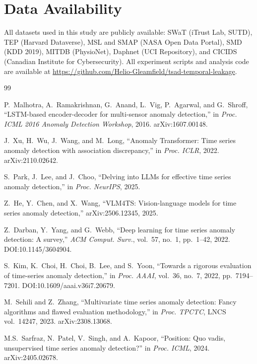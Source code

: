 \documentclass[preprint,12pt]{elsarticle}
\begin{document}
\section*{Data Availability}
All datasets used in this study are publicly available: SWaT (iTrust Lab, SUTD), TEP (Harvard Dataverse), MSL and SMAP (NASA Open Data Portal), SMD (KDD 2019), MITDB (PhysioNet), Daphnet (UCI Repository), and CICIDS (Canadian Institute for Cybersecurity). All experiment scripts and analysis code are available at \url{https://github.com/Helio-Gleamfield/tsad-temporal-leakage}.


\begin{thebibliography}{99}

P.~Malhotra, A.~Ramakrishnan, G.~Anand, L.~Vig, P.~Agarwal, and G.~Shroff, ``LSTM-based encoder-decoder for multi-sensor anomaly detection,'' in \emph{Proc. ICML 2016 Anomaly Detection Workshop}, 2016. arXiv:1607.00148.

J.~Xu, H.~Wu, J.~Wang, and M.~Long, ``Anomaly Transformer: Time series anomaly detection with association discrepancy,'' in \emph{Proc. ICLR}, 2022. arXiv:2110.02642.

S.~Park, J.~Lee, and J.~Choo, ``Delving into LLMs for effective time series anomaly detection,'' in \emph{Proc. NeurIPS}, 2025.

Z.~He, Y.~Chen, and X.~Wang, ``VLM4TS: Vision-language models for time series anomaly detection,'' arXiv:2506.12345, 2025.

Z.~Darban, Y.~Yang, and G.~Webb, ``Deep learning for time series anomaly detection: A survey,'' \emph{ACM Comput. Surv.}, vol.~57, no.~1, pp.~1--42, 2022. DOI:10.1145/3604904.

S.~Kim, K.~Choi, H.~Choi, B.~Lee, and S.~Yoon, ``Towards a rigorous evaluation of time-series anomaly detection,'' in \emph{Proc. AAAI}, vol.~36, no.~7, 2022, pp.~7194--7201. DOI:10.1609/aaai.v36i7.20679.

M.~Sehili and Z.~Zhang, ``Multivariate time series anomaly detection: Fancy algorithms and flawed evaluation methodology,'' in \emph{Proc. TPCTC}, LNCS vol.~14247, 2023. arXiv:2308.13068.

M.S.~Sarfraz, N.~Patel, V.~Singh, and A.~Kapoor, ``Position: Quo vadis, unsupervised time series anomaly detection?'' in \emph{Proc. ICML}, 2024. arXiv:2405.02678.


\end{thebibliography}
\end{document}

